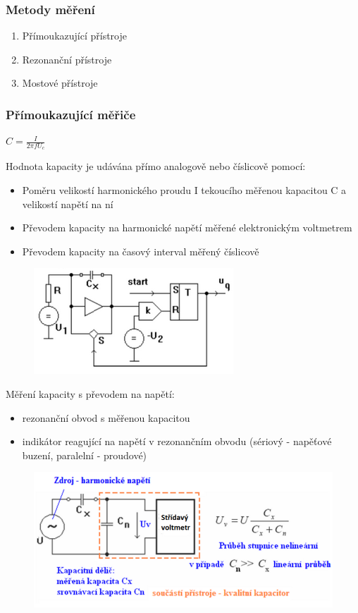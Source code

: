 \subsubsection{Metody měření}
\begin{enumerate}
    \item Přímoukazující přístroje
    \item Rezonanční přístroje
    \item Mostové přístroje
\end{enumerate}
\subsubsection{Přímoukazující měřiče}
\begin{center}
    \(C = \frac{I}{2\pi f U_c}\)
\end{center}
Hodnota kapacity je udávána přímo analogově nebo číslicově pomocí:
\begin{itemize}
    \item Poměru velikostí harmonického proudu I tekoucího měřenou kapacitou C a velikostí napětí na ní
    \item Převodem kapacity na harmonické napětí měřené elektronickým voltmetrem
    \item Převodem kapacity na časový interval měřený číslicově
\end{itemize}
\begin{figure}
    \centering
    \includegraphics[scale = 0.5]{images/PrimoukC1.png}
\end{figure}
Měření kapacity s převodem na napětí:
\begin{itemize}
    \item rezonanční obvod s měřenou kapacitou
    \item indikátor reagující na napětí v rezonančním obvodu (sériový - napěťové buzení, paralelní - proudové)
\end{itemize}
\begin{figure}[h!]
    \centering
    \includegraphics[scale = 0.5]{images/PrimoukC2.png}
\end{figure}
